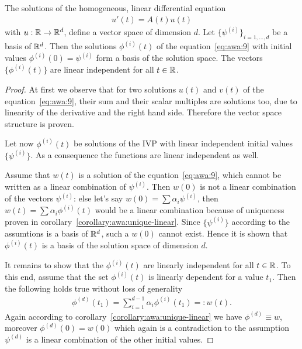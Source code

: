 \begin{lemma}
  The solutions of the homogeneous, linear differential equation
  \begin{gather}
    \label{eq:awa:9}
    u'(t) = A(t) u(t)
  \end{gather}
  with $u:\mathbb R\to\mathbb R^d$, define a vector space of dimension $d$. Let
  $\{\psi^{(i)}\}_{i=1,\dots,d}$ be a basis of $\mathbb R^d$. 
	Then the solutions $\phi^{(i)}(t)$ of the equation~\eqref{eq:awa:9} with 
  initial values $\phi^{(i)}(0) = \psi^{(i)}$ form a basis of the solution
  space. The vectors $\{\phi^{(i)}(t)\}$ are linear independent
  for all $t\in \mathbb R$.
\end{lemma}


\begin{proof}
  At first we observe that for two solutions $u(t)$ and $v(t)$ of the
  equation~\eqref{eq:awa:9}, their sum and their scalar multiples are
  solutions too, due to linearity  of the derivative
  and the right hand side.  Therefore the vector space structure is
  proven.
 
  Let now $\phi^{(i)}(t)$ be solutions of the IVP with linear
  independent initial values $\{\psi^{(i)}\}$.  As a consequence the
  functions are linear independent as well.

  Assume that $w(t)$ is a solution of the equation~\eqref{eq:awa:9},
  which cannot be written as a linear combination of $\psi^{(i)}$.
  Then $w(0)$ is not a linear combination of the vectors $\psi^{(i)}$:
  else let's say $w(0) = \sum \alpha_i \psi^{(i)}$, then
  $w(t) = \sum \alpha_i \phi^{(i)}(t)$ would be a linear combination
  because of uniqueness proven in
  corollary~\ref{corollary:awa:unique-linear}.  Since $\{\psi^{(i)}\}$
  according to the assumtions is a basis of $\mathbb R^d$, such a $w(0)$
  cannot exist.  Hence it is shown that $\phi^{(i)}(t)$ is a basis of
  the solution space of dimension $d$.
  
  It remains to show that the $\phi^{(i)}(t)$ are linearly independent
  for all $t\in \mathbb R$. To this end, assume that the set $\phi^{(i)}(t)$
  is linearly dependent for a value $t_1$.  Then the following holds
  true without loss of generality
  \begin{gather*}
    \phi^{(d)}(t_1) = \sum_{i=1}^{d-1}\alpha_i\phi^{(i)}(t_1) =: w(t).
  \end{gather*}
  Again according to corollary~\ref{corollary:awa:unique-linear} we
  have $\phi^{(d)} \equiv w$, moreover $\phi^{(d)}(0) = w(0)$ which
  again is a contradiction to the assumption $\psi^{(d)}$ is a linear
  combination of the other initial values.
\end{proof}

